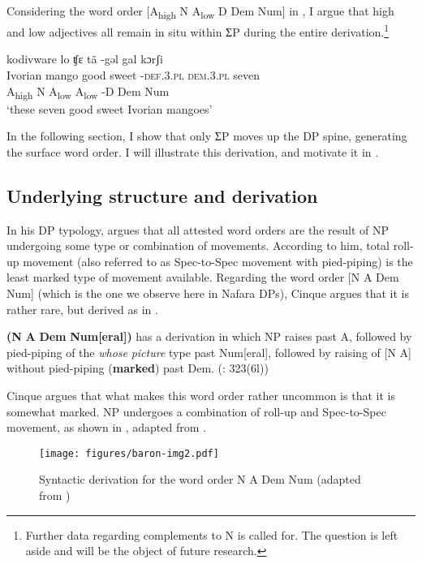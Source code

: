 \documentclass[output=paper]{langscibook}
\begin{document}
Considering the word order [A\textsubscript{high}  N  A\textsubscript{low}  D  Dem  Num] in , I argue that high and low adjectives all remain in situ within ƩP during the entire derivation.\footnote{Further data regarding complements to N is called for. The question is left aside and will be the object of future research.}  


\ea\label{ex:baron:14}
\glll kodivware lo ʧɛ tã -gəl gal kɔrʃi\\
   Ivorian mango good sweet  -\textsc{def.3.pl} \textsc{dem.3.pl} seven\\
   A\textsubscript{high}   N  A\textsubscript{low}  A\textsubscript{low}  -D  Dem  Num\\
\glt ‘these seven good sweet Ivorian mangoes’
\z

In the following section, I show that only ƩP moves up the DP spine, generating the surface word order. I will illustrate this derivation, and motivate it in .

 
\subsection{Underlying structure and derivation} 
\label{sec:baron:2.2}
In his DP typology, \citet{Cinque2005} argues that all attested word orders are the result of NP undergoing some type or combination of movements. According to him, total roll-up movement (also referred to as Spec-to-Spec movement with pied-piping) is the least marked type of movement available. Regarding the word order [N A Dem Num] (which is the one we observe here in Nafara DPs), Cinque argues that it is rather rare, but derived as in .

\ea\label{ex:baron:15}
\textbf{(N} \textbf{A} \textbf{Dem} \textbf{Num[eral])} has a derivation in which NP raises past A, followed by pied-piping of the \textit{whose} \textit{picture} type past Num[eral], followed by raising of [N A] without  pied-piping (\textbf{marked}) past Dem.        (\citealt{Cinque2005}: 323(6l))
\z

Cinque argues that what makes this word order rather uncommon is that it is somewhat marked. NP undergoes a combination of roll-up and Spec-to-Spec movement, as shown in , adapted from \citet{Cinque2005}.

  
\begin{figure}
\texttt{[image: figures/baron-img2.pdf]}
\caption{Syntactic derivation for the word order N A Dem Num (adapted from \citealt{Cinque2005})} 
\label{fig:baron:2}
\end{figure}
\end{document}
